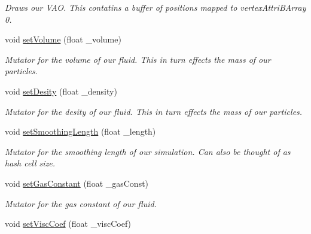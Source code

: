 \begin{DoxyCompactItemize}
\begin{DoxyCompactList}\small\item\em Draws our V\-A\-O. This contatins a buffer of positions mapped to vertex\-Attri\-B\-Array 0. \end{DoxyCompactList}\item 
\hypertarget{class_s_p_h_engine_add241056dc1719b3a11486da48c3724c}{void \hyperlink{class_s_p_h_engine_add241056dc1719b3a11486da48c3724c}{set\-Volume} (float \-\_\-volume)}\label{class_s_p_h_engine_add241056dc1719b3a11486da48c3724c}

\begin{DoxyCompactList}\small\item\em Mutator for the volume of our fluid. This in turn effects the mass of our particles. \end{DoxyCompactList}\item 
\hypertarget{class_s_p_h_engine_acbc638f7ab8fa2ab356dadf677df10c6}{void \hyperlink{class_s_p_h_engine_acbc638f7ab8fa2ab356dadf677df10c6}{set\-Desity} (float \-\_\-density)}\label{class_s_p_h_engine_acbc638f7ab8fa2ab356dadf677df10c6}

\begin{DoxyCompactList}\small\item\em Mutator for the desity of our fluid. This in turn effects the mass of our particles. \end{DoxyCompactList}\item 
\hypertarget{class_s_p_h_engine_a196e04ba23d9d9c73924f3af8a8240ed}{void \hyperlink{class_s_p_h_engine_a196e04ba23d9d9c73924f3af8a8240ed}{set\-Smoothing\-Length} (float \-\_\-length)}\label{class_s_p_h_engine_a196e04ba23d9d9c73924f3af8a8240ed}

\begin{DoxyCompactList}\small\item\em Mutator for the smoothing length of our simulation. Can also be thought of as hash cell size. \end{DoxyCompactList}\item 
\hypertarget{class_s_p_h_engine_a293fc06859e21473b03626a55c5c3a69}{void \hyperlink{class_s_p_h_engine_a293fc06859e21473b03626a55c5c3a69}{set\-Gas\-Constant} (float \-\_\-gas\-Const)}\label{class_s_p_h_engine_a293fc06859e21473b03626a55c5c3a69}

\begin{DoxyCompactList}\small\item\em Mutator for the gas constant of our fluid. \end{DoxyCompactList}\item 
\hypertarget{class_s_p_h_engine_a296c06a01cb0a93dfa150c3acea64493}{void \hyperlink{class_s_p_h_engine_a296c06a01cb0a93dfa150c3acea64493}{set\-Visc\-Coef} (float \-\_\-visc\-Coef)}\label{class_s_p_h_engine_a296c06a01cb0a93dfa150c3acea64493}


\end{DoxyCompactItemize}
